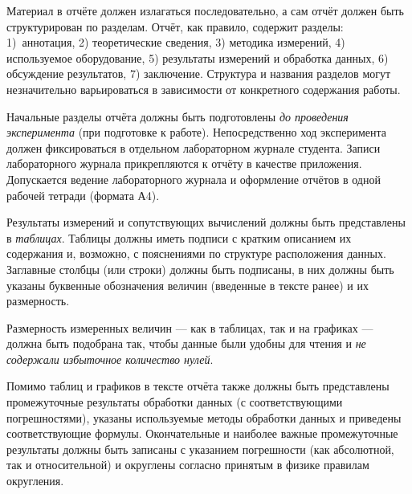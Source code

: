Материал в отчёте должен излагаться последовательно, а сам отчёт должен
быть структурирован по разделам. Отчёт, как правило, содержит разделы:
1) аннотация, 2) теоретические сведения, 3) методика измерений, 4)
используемое оборудование, 5) результаты измерений и обработка данных,
6) обсуждение результатов, 7) заключение. Структура и названия разделов
могут незначительно варьироваться в зависимости от конкретного содержания
работы.

Начальные разделы отчёта должны быть подготовлены \emph{до проведения
эксперимента} (при подготовке к работе). Непосредственно ход эксперимента
должен фиксироваться в отдельном лабораторном журнале студента. Записи
лабораторного журнала прикрепляются к отчёту в качестве приложения.
Допускается ведение лабораторного журнала и оформление отчётов в одной
рабочей тетради (формата А4).

Результаты измерений и сопутствующих вычислений должны быть представлены
в \emph{таблицах}. Таблицы должны иметь подписи с кратким описанием
их содержания и, возможно, с пояснениями по структуре расположения
данных. Заглавные столбцы (или строки) должны быть подписаны, в них
должны быть указаны буквенные обозначения величин (введенные в тексте
ранее) и их размерность. 

Размерность измеренных величин --- как в таблицах, так и
на графиках --- должна быть подобрана так, чтобы данные
были удобны для чтения и \emph{не содержали избыточное количество
нулей}.

Помимо таблиц и графиков в тексте отчёта также должны быть представлены
промежуточные результаты обработки данных (с соответствующими погрешностями),
указаны используемые методы обработки данных и приведены соответствующие
формулы. Окончательные и наиболее важные промежуточные результаты
должны быть записаны с указанием погрешности (как абсолютной, так
и относительной) и округлены согласно принятым в физике правилам округления.

